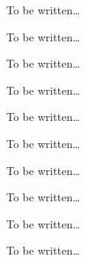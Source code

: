 \begin{command}{\pgfsys@animation@sum{}}
  To be written\dots
\end{command}

\begin{command}{\pgfsys@animation@replace{}}
  To be written\dots
\end{command}

\begin{command}{\pgfsys@animation@accumulate{}}
  To be written\dots
\end{command}

\begin{command}{\pgfsys@animation@noaccumulate{}}
  To be written\dots
\end{command}




\begin{command}{\pgfsys@animation@discrete{}}
  To be written\dots
\end{command}

\begin{command}{\pgfsys@animation@linear{}}
  To be written\dots
\end{command}

\begin{command}{\pgfsys@animation@paced{}}
  To be written\dots
\end{command}

\begin{command}{\pgfsys@animation@spline{}}
  To be written\dots
\end{command}

\begin{command}{\pgfsys@animation@rotatealong{}}
  To be written\dots
\end{command}

\begin{command}{\pgfsys@animation@norotatealong{}}
  To be written\dots
\end{command}

